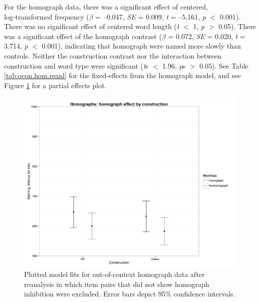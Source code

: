 For the homograph data, there was a significant effect of centered,\\ log-transformed frequency (\emph{$\beta$} = --0.047, \emph{SE} = 0.009, \emph{t} = --5.161, \emph{p} $<$ 0.001). There was no significant effect of centered word length (\emph{t} $<$ 1, \emph{p} $>$ 0.05). There was a significant effect of the homograph contrast (\emph{$\beta$} = 0.072, \emph{SE} = 0.020, \emph{t} = 3.714, \emph{p} $<$ 0.001), indicating that homograph were named more slowly than controls. Neither the construction contrast nor the interaction between construction and word type were significant (\emph{t}s $<$ 1.96, \emph{p}s $>$ 0.05). See Table \ref{tab:ocon.hom.reanl} for the fixed-effects from the homograph model, and see Figure \ref{fig:conXwordtype-homs-excluded} for a partial effects plot. 

\begin{figure}[htbp]
\centering
\includegraphics[width=\textwidth,height=\textheight,keepaspectratio]{conXwordtype-homs-excluded.png}
\caption{Plotted model fits for out-of-context homograph data after reanalysis in which item pairs that did not show homograph inhibition were excluded. Error bars depict 95\% confidence intervals.}
\label{fig:conXwordtype-homs-excluded}
\end{figure}


